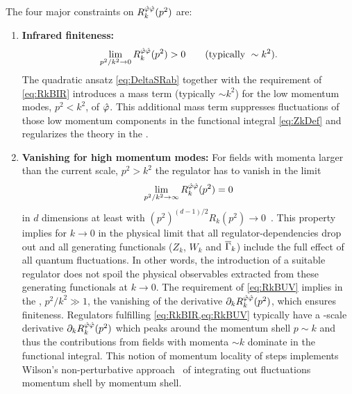 The four major constraints on $R_k^{\hat{\varphi}\hat{\varphi}}(p^2)$ are:
\begin{enumerate}
	\item {}\label{paragraph:regulatorIR}\textbf{Infrared finiteness:}
	\begin{align}
	\lim_{p^2/k^2\rightarrow 0 }R_k^{\hat{\varphi}\hat{\varphi}}(p^2)>0 \qquad (\text{typically }\sim k^2).\label{eq:RkBIR}
	\end{align}
	The quadratic ansatz \eqref{eq:DeltaSRab} together with the requirement of \cref{eq:RkBIR} introduces a mass term (typically $\sim k^2$) for the low momentum modes, $p^2<k^2$, of $\hat{\varphi}$. This additional mass term suppresses fluctuations of those low momentum components in the functional integral \eqref{eq:ZkDef} and regularizes the theory in the \ir{}.
	
	\item {}\label{paragraph:regulatorHighP}\textbf{Vanishing for high momentum modes:} For fields with momenta larger than the current scale, $p^2>k^2$ the regulator has to vanish in the limit
	\begin{align}
	\lim_{p^2/k^2\rightarrow \infty }R_k^{\hat{\varphi}\hat{\varphi}}(p^2)=0 \label{eq:RkBUV}
	\end{align}
	in $d$ dimensions at least with $(p^2)^{(d-1)/2}R_k(p^2)\rightarrow 0$~\cite{Pawlowski:2015mlf,PawlowskiScript}. 
	This property implies for $k\rightarrow 0$ \dash{} in the physical limit \dash{} that all regulator-dependencies drop out and all generating functionals ($Z_k$, $W_k$ and $\overline{\Gamma}_k$) include the full effect of all quantum fluctuations.
	In other words, the introduction of a suitable regulator does not spoil the physical \ir{} observables extracted from these generating functionals at $k\rightarrow 0$.
	The requirement of \cref{eq:RkBUV} implies in the \uv{}, $p^2/k^2\gg 1$, the vanishing of the \rgscale{} derivative $\partial_k R_k^{\hat{\varphi}\hat{\varphi}}(p^2)$, which ensures \uv{} finiteness.
	Regulators fulfilling \cref{eq:RkBIR,eq:RkBUV} typically have a \rg{}-scale derivative $\partial_k R_k^{\hat{\varphi}\hat{\varphi}}(p^2)$ which peaks around the momentum shell $p\sim k$ and thus the contributions from fields with momenta $\sim k$ dominate in the functional integral. This notion of momentum locality of \rg{} steps implements Wilson's non-perturbative \rg{} approach~\cite{Wilson:1971bg,Wilson:1971dh,Wilson:1979qg} of integrating out fluctuations momentum shell by momentum shell. 
	

\end{enumerate}
